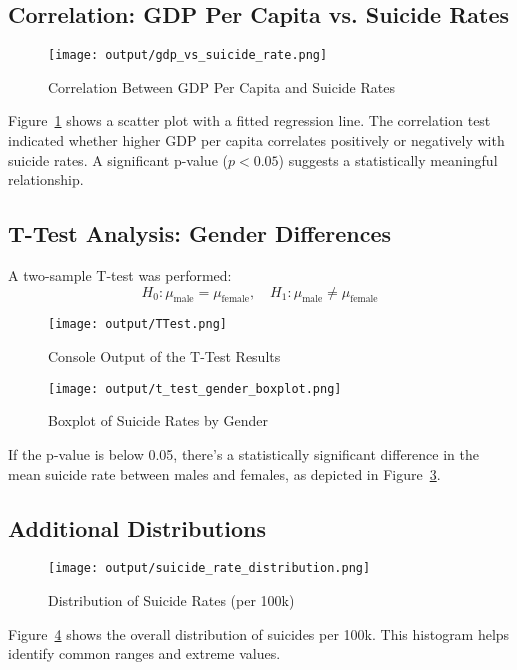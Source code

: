 \documentclass[12pt,a4paper]{article}
\begin{document}
\subsection{Correlation: GDP Per Capita vs. Suicide Rates}
\begin{figure}[H]
  \centering
  \texttt{[image: output/gdp\_vs\_suicide\_rate.png]}
  \caption{Correlation Between GDP Per Capita and Suicide Rates}
  \label{fig:gdp_corr}
\end{figure}

Figure~\ref{fig:gdp_corr} shows a scatter plot with a fitted regression line. The correlation test indicated whether higher GDP per capita correlates positively or negatively with suicide rates. A significant p-value ($p < 0.05$) suggests a statistically meaningful relationship.

\subsection{T-Test Analysis: Gender Differences}
A two-sample T-test was performed:
\[
H_0: \mu_{\text{male}} = \mu_{\text{female}}, \quad
H_1: \mu_{\text{male}} \neq \mu_{\text{female}}
\]
\begin{figure}[H]
  \centering
  \texttt{[image: output/TTest.png]}
  \caption{Console Output of the T-Test Results}
  \label{fig:t_console}
\end{figure}

\begin{figure}[H]
  \centering
  \texttt{[image: output/t\_test\_gender\_boxplot.png]}
  \caption{Boxplot of Suicide Rates by Gender}
  \label{fig:t_boxplot}
\end{figure}

If the p-value is below 0.05, there's a statistically significant difference in the mean suicide rate between males and females, as depicted in Figure~\ref{fig:t_boxplot}.

\subsection{Additional Distributions}
\begin{figure}[H]
  \centering
  \texttt{[image: output/suicide\_rate\_distribution.png]}
  \caption{Distribution of Suicide Rates (per 100k)}
  \label{fig:dist_suicides}
\end{figure}

Figure~\ref{fig:dist_suicides} shows the overall distribution of suicides per 100k. This histogram helps identify common ranges and extreme values.
\end{document}
